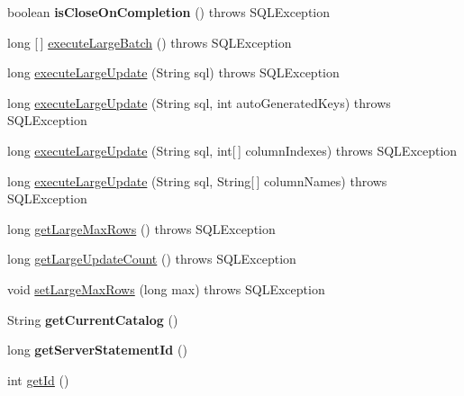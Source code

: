 \begin{DoxyCompactItemize}
boolean {\bfseries is\+Close\+On\+Completion} ()  throws S\+Q\+L\+Exception 
\item 
long \mbox{[}$\,$\mbox{]} \mbox{\hyperlink{classcom_1_1mysql_1_1cj_1_1jdbc_1_1_statement_impl_ad5138e585c47eef34667efe73d0a954f}{execute\+Large\+Batch}} ()  throws S\+Q\+L\+Exception 
\item 
long \mbox{\hyperlink{classcom_1_1mysql_1_1cj_1_1jdbc_1_1_statement_impl_a33be0126be83d0094c9d363132497a4e}{execute\+Large\+Update}} (String sql)  throws S\+Q\+L\+Exception 
\item 
long \mbox{\hyperlink{classcom_1_1mysql_1_1cj_1_1jdbc_1_1_statement_impl_acb364f005fd4a5b579ebecbc3303fca9}{execute\+Large\+Update}} (String sql, int auto\+Generated\+Keys)  throws S\+Q\+L\+Exception 
\item 
long \mbox{\hyperlink{classcom_1_1mysql_1_1cj_1_1jdbc_1_1_statement_impl_a80eeb600ed30f4f2dc7ea99891e594b1}{execute\+Large\+Update}} (String sql, int\mbox{[}$\,$\mbox{]} column\+Indexes)  throws S\+Q\+L\+Exception 
\item 
long \mbox{\hyperlink{classcom_1_1mysql_1_1cj_1_1jdbc_1_1_statement_impl_ac8be77a2303189e5efa1c5c9d34d0962}{execute\+Large\+Update}} (String sql, String\mbox{[}$\,$\mbox{]} column\+Names)  throws S\+Q\+L\+Exception 
\item 
long \mbox{\hyperlink{classcom_1_1mysql_1_1cj_1_1jdbc_1_1_statement_impl_a413626efa58d8aac8c72b36bb0ff4c33}{get\+Large\+Max\+Rows}} ()  throws S\+Q\+L\+Exception 
\item 
long \mbox{\hyperlink{classcom_1_1mysql_1_1cj_1_1jdbc_1_1_statement_impl_aeb27ff7e4f987d731094d20bf30fefad}{get\+Large\+Update\+Count}} ()  throws S\+Q\+L\+Exception 
\item 
void \mbox{\hyperlink{classcom_1_1mysql_1_1cj_1_1jdbc_1_1_statement_impl_adcb9676c5158982c94c3213a11feeb17}{set\+Large\+Max\+Rows}} (long max)  throws S\+Q\+L\+Exception 
\item 
\mbox{\label{classcom_1_1mysql_1_1cj_1_1jdbc_1_1_statement_impl_af2b2cc49667c4ca719920667ed148629}} 
String {\bfseries get\+Current\+Catalog} ()
\item 
\mbox{\label{classcom_1_1mysql_1_1cj_1_1jdbc_1_1_statement_impl_ae87860ea933fb4d96b255f57d5fa5580}} 
long {\bfseries get\+Server\+Statement\+Id} ()
\item 
int \mbox{\hyperlink{classcom_1_1mysql_1_1cj_1_1jdbc_1_1_statement_impl_a42a752f62a59215845a9faf514893dba}{get\+Id}} ()

\end{DoxyCompactItemize}
